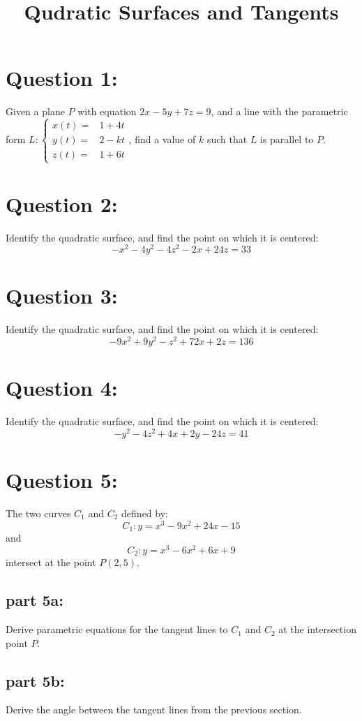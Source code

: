 \documentclass{article}
\title{Qudratic Surfaces and Tangents}
\date{}
\begin{document}
\maketitle

\section*{Question 1:}

Given a plane \(P\) with equation \(2x - 5y + 7z = 9\), and a line with the parametric form \(L: \left\{\begin{array}{rl} x(t) = & 1 + 4t \\ y(t) = & 2 - kt \\ z(t) = & 1 + 6t \end{array}\right.\), find a value of \(k\) such that \(L\) is parallel to \(P\).



\section*{Question 2:}

Identify the quadratic surface, and find the point on which it is centered:
\[-x^2 - 4y^2 - 4z^2 - 2x + 24z = 33\]



\section*{Question 3:}

Identify the quadratic surface, and find the point on which it is centered:
\[-9x^2 + 9y^2 - z^2 + 72x + 2z = 136\]



\section*{Question 4:}

Identify the quadratic surface, and find the point on which it is centered:
\[-y^2 - 4z^2 + 4x + 2y - 24z = 41\]



\section*{Question 5:}

The two curves \(C_1\) and \(C_2\) defined by:
\[C_1: y = x^3 - 9x^2 + 24x - 15\]
and 
\[C_2: y = x^3 - 6x^2 + 6x + 9\]
intersect at the point \(P(2,5)\). 

\subsection*{part 5a:}

Derive parametric equations for the tangent lines to \(C_1\) and \(C_2\) at the intersection point \(P\).  

\subsection*{part 5b:}

Derive the angle between the tangent lines from the previous section.
\end{document}
